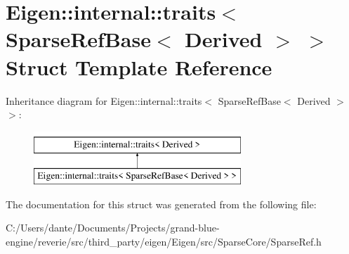 \hypertarget{struct_eigen_1_1internal_1_1traits_3_01_sparse_ref_base_3_01_derived_01_4_01_4}{}\section{Eigen\+::internal\+::traits$<$ Sparse\+Ref\+Base$<$ Derived $>$ $>$ Struct Template Reference}
\label{struct_eigen_1_1internal_1_1traits_3_01_sparse_ref_base_3_01_derived_01_4_01_4}
Inheritance diagram for Eigen\+::internal\+::traits$<$ Sparse\+Ref\+Base$<$ Derived $>$ $>$\+:\begin{figure}[H]
\begin{center}
\leavevmode
\includegraphics[height=2.000000cm]{struct_eigen_1_1internal_1_1traits_3_01_sparse_ref_base_3_01_derived_01_4_01_4}
\end{center}
\end{figure}


The documentation for this struct was generated from the following file\+:\begin{DoxyCompactItemize}
\item 
C\+:/\+Users/dante/\+Documents/\+Projects/grand-\/blue-\/engine/reverie/src/third\+\_\+party/eigen/\+Eigen/src/\+Sparse\+Core/Sparse\+Ref.\+h\end{DoxyCompactItemize}
